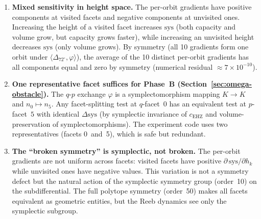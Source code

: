 \begin{enumerate}
\item \textbf{Mixed sensitivity in height space.}
  The per-orbit gradients have positive components at visited facets
  and negative components at unvisited ones.
  Increasing the height of a visited facet increases
  $\mathrm{sys}$ (both capacity and volume grow, but capacity
  grows faster), while increasing an unvisited height
  decreases $\mathrm{sys}$ (only volume grows).
  By symmetry (all 10 gradients form one orbit under
  $\langle \Delta_{72^\circ}, \varphi \rangle$),
  the average of the 10 distinct per-orbit gradients has all
  components equal and zero by symmetry (numerical residual $\approx 7 \times 10^{-10}$).

\item \textbf{One representative facet suffices for Phase~B
  (Section~\ref{sec:omega-obstacle}).}
  The $q$\nobreakdash-$p$ exchange $\varphi$ is a symplectomorphism
  mapping $K \to K$ and $n_0 \mapsto n_5$.
  Any facet-splitting test at $q$-facet~$0$ has an equivalent test at
  $p$-facet~$5$ with identical $\Delta\mathrm{sys}$
  (by symplectic invariance of $c_{\mathrm{EHZ}}$
  and volume-preservation of symplectomorphisms).
  The experiment code uses two representatives (facets 0~and~5), which
  is safe but redundant.

\item \textbf{The ``broken symmetry'' is symplectic, not broken.}
  The per-orbit gradients are not uniform across facets: visited facets
  have positive $\partial\,\mathrm{sys}/\partial h_k$
  while unvisited ones have negative values.
  This variation is not a symmetry defect but the natural action of the
  symplectic symmetry group (order~10) on the subdifferential.
  The full polytope symmetry (order~50) makes all facets equivalent
  as geometric entities, but the Reeb dynamics see only the symplectic
  subgroup.
\end{enumerate}
